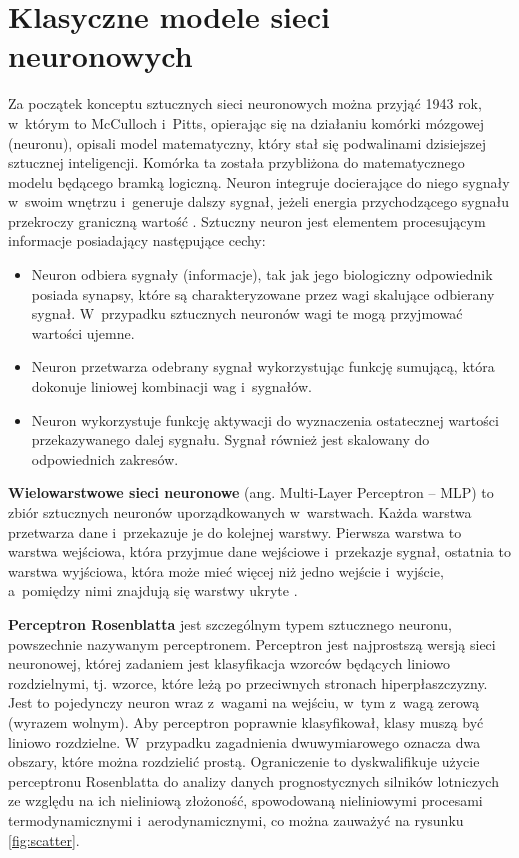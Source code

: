 \newpage
\section{Klasyczne modele sieci neuronowych}

Za początek konceptu sztucznych sieci neuronowych można przyjąć 1943 rok, w~którym to McCulloch i~Pitts, opierając się na działaniu komórki mózgowej (neuronu), opisali model matematyczny, który stał się podwalinami dzisiejszej sztucznej inteligencji. Komórka ta została przybliżona do matematycznego modelu będącego bramką logiczną. Neuron integruje docierające do niego sygnały w~swoim wnętrzu i~generuje dalszy sygnał, jeżeli energia przychodzącego sygnału przekroczy graniczną wartość \cite{raschka_python}.
Sztuczny neuron jest elementem procesującym informacje \cite{haykin2009neural} posiadający następujące cechy:

\begin{itemize}
    \item Neuron odbiera sygnały (informacje), tak jak jego biologiczny odpowiednik posiada synapsy, które są charakteryzowane przez wagi skalujące odbierany sygnał. W~przypadku sztucznych neuronów wagi te mogą przyjmować wartości ujemne.
    \item Neuron przetwarza odebrany sygnał wykorzystując funkcję sumującą, która dokonuje liniowej kombinacji wag i~sygnałów.
    \item Neuron wykorzystuje funkcję aktywacji do wyznaczenia ostatecznej wartości przekazywanego dalej sygnału. Sygnał również jest skalowany do odpowiednich zakresów.
\end{itemize} 
    
\textbf{Wielowarstwowe sieci neuronowe} (ang. Multi-Layer Perceptron – MLP) to zbiór sztucznych neuronów uporządkowanych w~warstwach. Każda warstwa przetwarza dane i~przekazuje je do kolejnej warstwy. Pierwsza warstwa to warstwa wejściowa, która przyjmue dane wejściowe i~przekazje sygnał, ostatnia to warstwa wyjściowa, która może mieć więcej niż jedno wejście i~wyjście, a~pomiędzy nimi znajdują się warstwy ukryte \cite{tutorial_nn_activation}.

\textbf{Perceptron Rosenblatta} jest szczególnym typem sztucznego neuronu, powszechnie nazywanym perceptronem. Perceptron jest najprostszą wersją sieci neuronowej, której zadaniem jest klasyfikacja wzorców będących liniowo rozdzielnymi, tj. wzorce, które leżą po przeciwnych stronach hiperpłaszczyzny. 
Jest to pojedynczy neuron wraz z~wagami na wejściu, w~tym z~wagą zerową (wyrazem wolnym). 
Aby perceptron poprawnie klasyfikował, klasy muszą być liniowo rozdzielne. W~przypadku zagadnienia dwuwymiarowego oznacza dwa obszary, które można rozdzielić prostą.
Ograniczenie to dyskwalifikuje użycie perceptronu Rosenblatta do analizy danych prognostycznych silników lotniczych ze względu na ich nieliniową złożoność, spowodowaną nieliniowymi procesami termodynamicznymi i~aerodynamicznymi, co można zauważyć na rysunku \ref{fig:scatter}.


